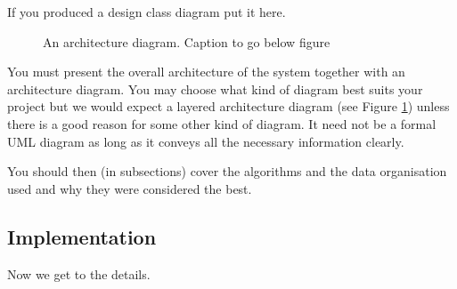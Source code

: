 \documentclass[11pt,a4paper]{article}
\begin{document}
If you produced a design class diagram put it here.

\begin{figure}[h!]
  \caption{An architecture diagram. Caption to go below figure}
  \label{fig:architecture}
\end{figure}

You must present the overall architecture of the system together with
an architecture diagram. You may choose what kind of diagram best
suits your project but we would expect a layered architecture diagram
(see Figure \ref{fig:architecture}) unless there is a good reason for
some other kind of diagram. It need not be a formal UML diagram as
long as it conveys all the necessary information clearly.

You should then (in subsections) cover the algorithms and the data
organisation used and why they were considered the best. 

\subsection{Implementation}

Now we get to the details. 
\end{document}
